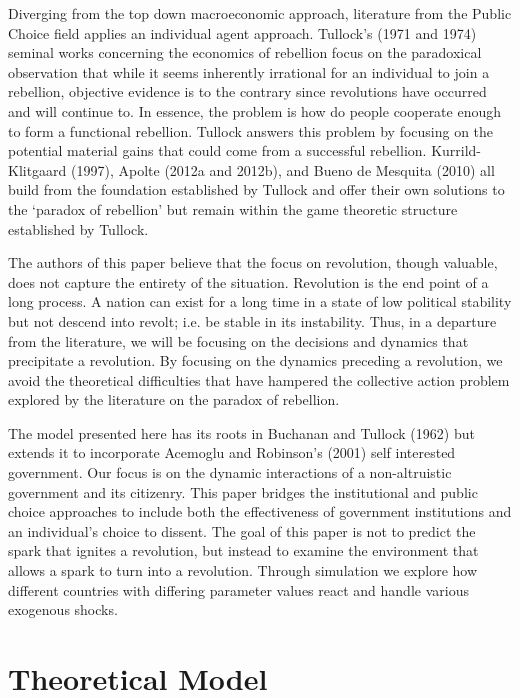 \documentclass[12pt]{article}
\begin{document}
\begin{spacing}{1.5}
Diverging from the top down macroeconomic approach, literature from the Public Choice field applies an individual agent approach. Tullock's (1971 and 1974) seminal works concerning the economics of rebellion focus on the paradoxical observation that while it seems inherently irrational for an individual to join a rebellion, objective evidence is to the contrary since revolutions have occurred and will continue to. In essence, the problem is how do people cooperate enough to form a functional rebellion. Tullock answers this problem by focusing on the potential material gains that could come from a successful rebellion. Kurrild-Klitgaard (1997), Apolte (2012a and 2012b), and Bueno de Mesquita (2010) all build from the foundation established by Tullock and offer their own solutions to the `paradox of rebellion' but remain within the game theoretic structure established by Tullock. 

The authors of this paper believe that the focus on revolution, though valuable, does not capture the entirety of the situation. Revolution is the end point of a long process. A nation can exist for a long time in a state of low political stability but not descend into revolt; i.e. be stable in its instability. Thus, in a departure from the literature, we will be focusing on the decisions and dynamics that precipitate a revolution. By focusing on the dynamics preceding a revolution, we avoid the theoretical difficulties that have hampered the collective action problem explored by the literature on the paradox of rebellion.  

The model presented here has its roots in Buchanan and Tullock (1962) but extends it to incorporate Acemoglu and Robinson's (2001) self interested government. Our focus is on the dynamic interactions of a non-altruistic government and its citizenry. This paper bridges the institutional and public choice approaches to include both the effectiveness of government institutions and an individual's choice to dissent. The goal of this paper is not to predict the spark that ignites a revolution, but instead to examine the environment that allows a spark to turn into a revolution. Through simulation we explore how different countries with differing parameter values react and handle various exogenous shocks. 

  

\section{Theoretical Model}


\end{spacing}
\end{document}
